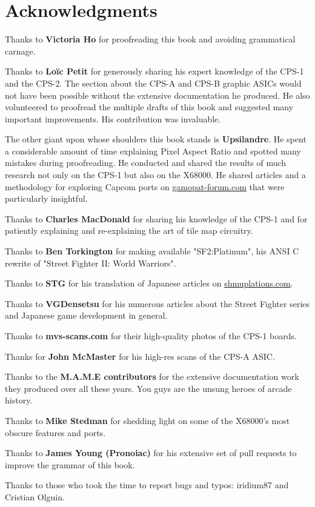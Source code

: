 \chapter*{Acknowledgments} 

Thanks to \textbf{Victoria Ho} for proofreading this book and avoiding grammatical carnage.

Thanks to \textbf{Lo\"{i}c Petit} for generously sharing his expert knowledge of the CPS-1 and the CPS-2. The section about the CPS-A and CPS-B graphic ASICs would not have been possible without the extensive documentation he produced. He also volunteered to proofread the multiple drafts of this book and suggested many important improvements. His contribution was invaluable.

The other giant upon whose shoulders this book stands is \textbf{Upsilandre}. He spent a considerable amount of time explaining Pixel Aspect Ratio and spotted many mistakes during proofreading. He conducted and shared the results of much research not only on the CPS-1 but also on the X68000. He shared articles and a methodology for exploring Capcom ports on \href{https://www.gamopat-forum.com}{gamopat-forum.com} that were particularly insightful.

Thanks to \textbf{Charles MacDonald} for sharing his knowledge of the CPS-1 and for patiently explaining and re-explaining the art of tile map circuitry.

Thanks to \textbf{Ben Torkington} for making available "SF2:Platinum", his ANSI C rewrite of "Street Fighter II: World Warriors".

Thanks to \textbf{STG} for his translation of Japanese articles on \href{https://shmuplations.com}{shmuplations.com}.

Thanks to \textbf{VGDensetsu} for his numerous articles about the Street Fighter series and Japanese game development in general.

Thanks to \textbf{mvs-scans.com} for their high-quality photos of the CPS-1 boards.

Thanks for \textbf{John McMaster} for his high-res scans of the CPS-A ASIC.

Thanks to the \textbf{M.A.M.E contributors} for the extensive documentation work they produced over all these years. You guys are the unsung heroes of arcade history.

Thanks to \textbf{Mike Stedman} for shedding light on some of the X68000's most obscure features and ports.

Thanks to \textbf{James Young (Pronoiac)} for his extensive set of pull requests to improve the grammar of this book.

Thanks to those who took the time to report bugs and typos: iridium87 and Cristian Olguin.
